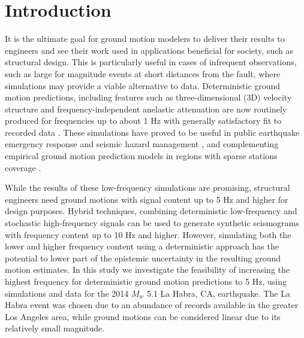 \section{Introduction} \label{highf:intro}
It is the ultimate goal for ground motion modelers to deliver their results to engineers and see their work used in applications beneficial for society, such as structural design. This is particularly useful in cases of infrequent observations, such as large for magnitude events at short distances from the fault, where simulations may provide a viable alternative to data. Deterministic ground motion predictions, including features such as three-dimensional (3D) velocity structure and frequency-independent anelastic attenuation are now routinely produced for frequencies up to about 1 Hz with generally satisfactory fit to recorded data . These simulations have proved to be useful in public earthquake emergency response and seismic hazard management \citep[e.g., the SHAKEOUT scenario; ][]{jones2008shakeout}, and complementing empirical ground motion prediction models in regions with sparse stations coverage .

While the results of these low-frequency simulations are promising, structural engineers need ground motions with signal content up to 5 Hz and higher for design purposes. Hybrid techniques, combining deterministic low-frequency and stochastic high-frequency signals  can be used to generate synthetic seismograms with frequency content up to 10 Hz and higher. However, simulating both the lower and higher frequency content using a deterministic approach has the potential to lower part of the epistemic uncertainty in the resulting ground motion estimates. In this study we investigate the feasibility of increasing the highest frequency for deterministic ground motion predictions to 5 Hz, using simulations and data for the 2014 $M_w$ 5.1 La Habra, CA, earthquake. The La Habra event was chosen due to an abundance of records available in the greater Los Angeles area, while ground motions can be considered linear due to its relatively small magnitude.


